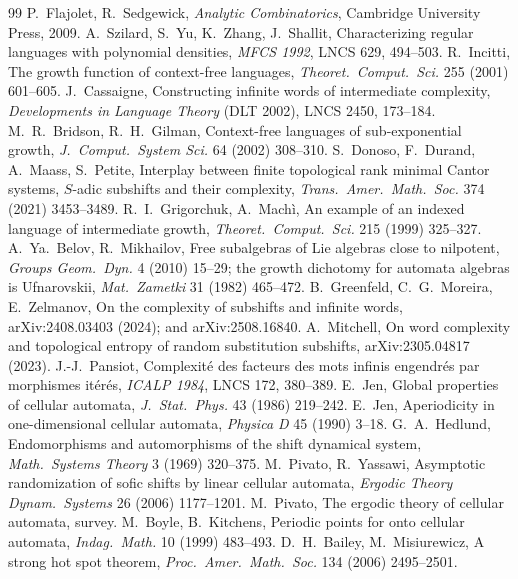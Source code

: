 \documentclass[11pt]{article}
\theoremstyle{definition}
\theoremstyle{remark}
\begin{document}
\begin{thebibliography}{99}
 P.~Flajolet, R.~Sedgewick, \emph{Analytic Combinatorics}, Cambridge University Press, 2009.
 A.~Szilard, S.~Yu, K.~Zhang, J.~Shallit, Characterizing regular languages with polynomial densities, \emph{MFCS 1992}, LNCS 629, 494--503.
 R.~Incitti, The growth function of context-free languages, \emph{Theoret.\ Comput.\ Sci.} 255 (2001) 601--605.
 J.~Cassaigne, Constructing infinite words of intermediate complexity, \emph{Developments in Language Theory} (DLT 2002), LNCS 2450, 173--184.
 M.~R.~Bridson, R.~H.~Gilman, Context-free languages of sub-exponential growth, \emph{J.~Comput.\ System Sci.} 64 (2002) 308--310.
 S.~Donoso, F.~Durand, A.~Maass, S.~Petite, Interplay between finite topological rank minimal Cantor systems, $S$-adic subshifts and their complexity, \emph{Trans.\ Amer.\ Math.\ Soc.} 374 (2021) 3453--3489.
 R.~I.~Grigorchuk, A.~Mach\`i, An example of an indexed language of intermediate growth, \emph{Theoret.\ Comput.\ Sci.} 215 (1999) 325--327.
 A.~Ya.~Belov, R.~Mikhailov, Free subalgebras of Lie algebras close to nilpotent, \emph{Groups Geom.\ Dyn.} 4 (2010) 15--29; the growth dichotomy for automata algebras is Ufnarovskii, \emph{Mat.\ Zametki} 31 (1982) 465--472.
 B.~Greenfeld, C.~G.~Moreira, E.~Zelmanov, On the complexity of subshifts and infinite words, arXiv:2408.03403 (2024); and arXiv:2508.16840.
 A.~Mitchell, On word complexity and topological entropy of random substitution subshifts, arXiv:2305.04817 (2023).
 J.-J.~Pansiot, Complexit\'e des facteurs des mots infinis engendr\'es par morphismes it\'er\'es, \emph{ICALP 1984}, LNCS 172, 380--389.
 E.~Jen, Global properties of cellular automata, \emph{J.~Stat.~Phys.} 43 (1986) 219--242.
 E.~Jen, Aperiodicity in one-dimensional cellular automata, \emph{Physica D} 45 (1990) 3--18.
 G.~A.~Hedlund, Endomorphisms and automorphisms of the shift dynamical system, \emph{Math.\ Systems Theory} 3 (1969) 320--375.
 M.~Pivato, R.~Yassawi, Asymptotic randomization of sofic shifts by linear cellular automata, \emph{Ergodic Theory Dynam.\ Systems} 26 (2006) 1177--1201.
 M.~Pivato, The ergodic theory of cellular automata, survey.
 M.~Boyle, B.~Kitchens, Periodic points for onto cellular automata, \emph{Indag.\ Math.} 10 (1999) 483--493.
 D.~H.~Bailey, M.~Misiurewicz, A strong hot spot theorem, \emph{Proc.\ Amer.\ Math.\ Soc.} 134 (2006) 2495--2501.

\end{thebibliography}
\end{document}
